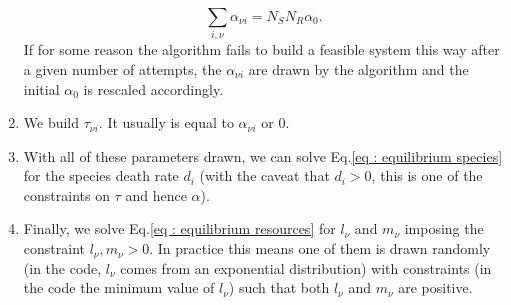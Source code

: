 \documentclass[12pt, titlepage]{report}
\begin{document}
\begin{enumerate}
  \begin{equation}
    \sum_{i,\nu} \alpha_{\nu i} = N_S N_R \alpha_0.
  \end{equation}
  If for some reason the algorithm fails to build a feasible system this way after a given number of attempts, the $\alpha_{\nu i}$ are drawn by the algorithm and the initial $\alpha_0$ is rescaled accordingly.
  \item We build $\tau_{\nu i}$. It usually is equal to $\alpha_{\nu i}$ or 0.
  \item With all of these parameters drawn, we can solve Eq.\eqref{eq : equilibrium species} for the species death rate $d_i$ (with the caveat that $d_i > 0$, this is one of the constraints on $\tau$ and hence $\alpha$).
  \item Finally, we solve Eq.\eqref{eq : equilibrium resources} for $l_\nu$ and $m_\nu$ imposing the constraint $l_\nu, m_\nu > 0$. In practice this means one of them is drawn randomly (in the code, $l_\nu$ comes from an exponential distribution) with constraints (in the code the minimum value of $l_\nu$) such that both $l_\nu$ and $m_\nu$ are positive.
\end{enumerate}
\end{document}
